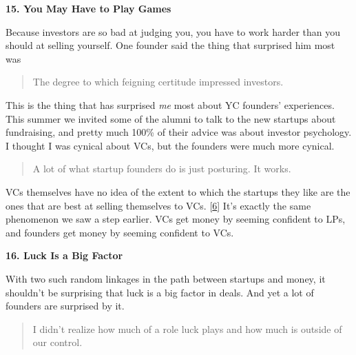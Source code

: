                   \textbf{15. You May Have to Play Games}

Because
                  investors are so bad at judging you, you have to work harder
                  than you should at selling yourself. One founder said the
                  thing that surprised him most was
                  \begin{quote}

                    The degree to which feigning certitude impressed investors.
                  
\end{quote}

                  This is the thing that has surprised \emph{me} most about YC
                  founders' experiences. This summer we invited some of the
                  alumni to talk to the new startups about fundraising, and
                  pretty much 100\% of their advice was about investor
                  psychology. I thought I was cynical about VCs, but the
                  founders were much more cynical.
                  \begin{quote}

                    A lot of what startup founders do is just posturing. It
                    works.
                  
\end{quote}

                  VCs themselves have no idea of the extent to which the
                  startups they like are the ones that are best at selling
                  themselves to VCs.
                  [\href{\#f6n}{6}]
                  It's exactly the same phenomenon we saw a step earlier. VCs
                  get money by seeming confident to LPs, and founders get money
                  by seeming confident to VCs.


                  \textbf{16. Luck Is a Big Factor}

With two such
                  random linkages in the path between startups and money, it
                  shouldn't be surprising that luck is a big factor in deals.
                  And yet a lot of founders are surprised by it.
                  \begin{quote}

                    I didn't realize how much of a role luck plays and how much
                    is outside of our control.
                  
\end{quote}


